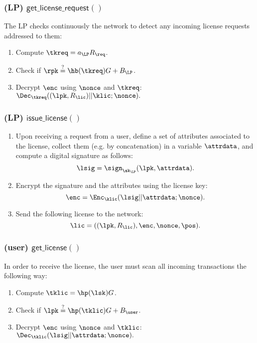 \subsubsection{(\textbf{LP}) $\mathsf{get\_license\_request()}$}

The LP checks continuously the network to detect any incoming license requests addressed to them:

\begin{enumerate}
	\item Compute $\tkreq = a_{\LP}R_{\req}$.
	\item Check if $\rpk \stackrel{?}{=} \hb(\tkreq) G + B_{\LP}$.
	\item Decrypt $\enc$ using $\nonce$ and $\tkreq$: $\Dec_{\tkreq} ((\lpk, R_{\lic})||\klic; \nonce).$
\end{enumerate}

\subsubsection{(\textbf{LP}) $\mathsf{issue\_license()}$}

\begin{enumerate}
	\item Upon receiving a request from a user, define a set of attributes associated to the license, collect them (e.g. by concatenation) in a variable $\attrdata$, and compute a digital signature as follows:
	$$\lsig = \sign_{\sk_{\LP}}(\lpk, \attrdata).$$
	\item Encrypt the signature and the attributes using the license key:
	$$\enc = \Enc_{\klic} (\lsig || \attrdata; \nonce).$$
	\item Send the following license to the network:
	$$\lic = ((\lpk, R_{\lic}), \enc, \nonce, \pos).$$
\end{enumerate}

\subsubsection{(\textbf{user}) $\mathsf{get\_license()}$}

In order to receive the license, the user must scan all incoming transactions the following way:

\begin{enumerate}
	\item Compute $\tklic = \hp(\lsk)G$.
	\item Check if $\lpk \stackrel{?}{=} \hp(\tklic) G + B_{\user}$.
	\item Decrypt $\enc$ using $\nonce$ and $\tklic$: $\Dec_{\tklic}  (\lsig || \attrdata; \nonce).$
\end{enumerate}	

